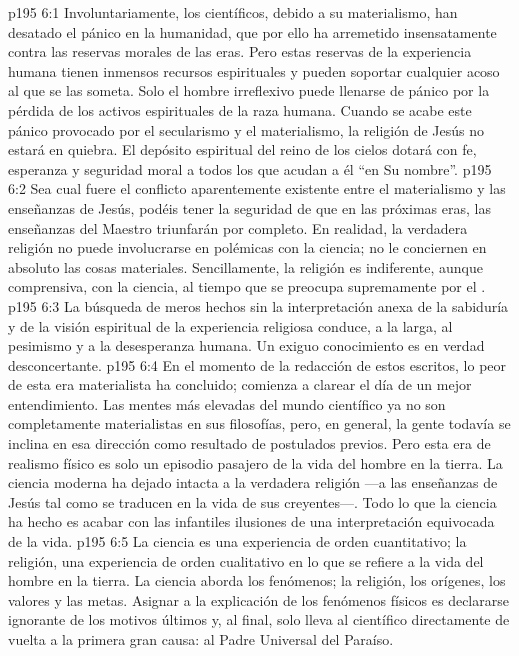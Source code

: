 \vs p195 6:1 Involuntariamente, los científicos, debido a su materialismo, han desatado el pánico en la humanidad, que por ello ha arremetido insensatamente contra las reservas morales de las eras. Pero estas reservas de la experiencia humana tienen inmensos recursos espirituales y pueden soportar cualquier acoso al que se las someta. Solo el hombre irreflexivo puede llenarse de pánico por la pérdida de los activos espirituales de la raza humana. Cuando se acabe este pánico provocado por el secularismo y el materialismo, la religión de Jesús no estará en quiebra. El depósito espiritual del reino de los cielos dotará con fe, esperanza y seguridad moral a todos los que acudan a él “en Su nombre”.
\vs p195 6:2 Sea cual fuere el conflicto aparentemente existente entre el materialismo y las enseñanzas de Jesús, podéis tener la seguridad de que en las próximas eras, las enseñanzas del Maestro triunfarán por completo. En realidad, la verdadera religión no puede involucrarse en polémicas con la ciencia; no le conciernen en absoluto las cosas materiales. Sencillamente, la religión es indiferente, aunque comprensiva, con la ciencia, al tiempo que se preocupa supremamente por el .
\vs p195 6:3 La búsqueda de meros hechos sin la interpretación anexa de la sabiduría y de la visión espiritual de la experiencia religiosa conduce, a la larga, al pesimismo y a la desesperanza humana. Un exiguo conocimiento es en verdad desconcertante.
\vs p195 6:4 En el momento de la redacción de estos escritos, lo peor de esta era materialista ha concluido; comienza a clarear el día de un mejor entendimiento. Las mentes más elevadas del mundo científico ya no son completamente materialistas en sus filosofías, pero, en general, la gente todavía se inclina en esa dirección como resultado de postulados previos. Pero esta era de realismo físico es solo un episodio pasajero de la vida del hombre en la tierra. La ciencia moderna ha dejado intacta a la verdadera religión ---a las enseñanzas de Jesús tal como se traducen en la vida de sus creyentes---. Todo lo que la ciencia ha hecho es acabar con las infantiles ilusiones de una interpretación equivocada de la vida.
\vs p195 6:5 La ciencia es una experiencia de orden cuantitativo; la religión, una experiencia de orden cualitativo en lo que se refiere a la vida del hombre en la tierra. La ciencia aborda los fenómenos; la religión, los orígenes, los valores y las metas. Asignar  a la explicación de los fenómenos físicos es declararse ignorante de los motivos últimos y, al final, solo lleva al científico directamente de vuelta a la primera gran causa: al Padre Universal del Paraíso.
